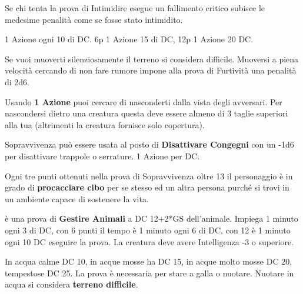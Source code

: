 \documentclass[landscape,10pt,a4paper]{article}
\begin{document}
\begin{multicols}{3}
\begin{dmbox}[title=Intimidire - pagina \pageref{intimidire}]
Se chi tenta la prova di Intimidire esegue un fallimento critico subisce le medesime penalità come se fosse stato intimidito.
\end{dmbox}


\begin{dmbox}[title=Artista della Fuga - pagina \pageref{artistadellafuga}]
	1 Azione ogni 10 di DC. 6p 1 Azione 15 di DC, 12p 1 Azione 20 DC.
\end{dmbox}

\begin{dmbox}[title=Furtività - pagina \pageref{furtivita}]
Se vuoi muoverti silenziosamente il terreno si considera difficile. Muoversi a piena velocità cercando di non fare rumore impone alla prova di Furtività una penalità di 2d6.

Usando \textbf{1 Azione} puoi cercare di nasconderti dalla vista degli avversari. Per nascondersi dietro una creatura questa deve essere almeno di 3 taglie superiori alla tua (altrimenti la creatura fornisce solo copertura).
\end{dmbox}


\begin{dmbox}[title=Sopravvivenza - pagina \pageref{sopravvivenza}]
Sopravvivenza può essere usata al posto di \textbf{Disattivare Congegni} con un -1d6 per disattivare trappole o serrature. 1 Azione per DC.

Ogni tre punti ottenuti nella prova di Sopravvivenza oltre 13 il personaggio è in grado di \textbf{procacciare cibo} per se stesso ed un altra persona purché si trovi in un ambiente capace di sostenere la vita.
\end{dmbox}

\begin{dmbox}[title=Gestire Animali - Ammansire un animale - pagina \pageref{gestireanimali}]
è una prova di \textbf{Gestire Animali} a DC 12+2*GS dell'animale. Impiega 1 minuto ogni 3 di DC, con 6 punti il tempo è 1 minuto ogni 6 di DC, con 12 è 1 minuto ogni 10 DC eseguire la prova. La creatura deve avere Intelligenza -3 o superiore.
\end{dmbox}

\begin{dmbox}[title=Nuotare - pagina \pageref{compnuotare} - \pageref{combatteresottacqua}]
In acqua calme DC 10, in acque mosse ha DC 15, in acque molto mosse DC 20, tempestose DC 25. La prova è necessaria per stare a galla o nuotare. Nuotare in acqua si considera \textbf{terreno difficile}.
\end{dmbox}


\end{multicols}
\end{document}
